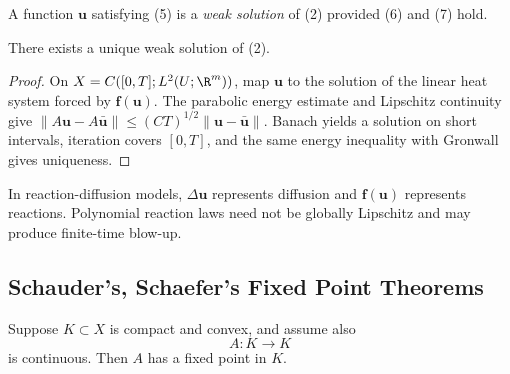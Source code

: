\begin{definition}
\label{def:weak-solution-reaction-diffusion-system}
A function $\mathbf{u}$ satisfying (5) is a \textit{weak solution} of (2) provided (6) and (7) hold.
\end{definition}

\begin{theorem}
\label{thm:reaction-diffusion-banach-existence}
There exists a unique weak solution of (2).
\end{theorem}

\begin{proof}
\sketch On $X=C([0,T];L^2(U;\R^m))$, map $\mathbf u$ to the solution of the linear heat system forced by $\mathbf f(\mathbf u)$. The parabolic energy estimate and Lipschitz continuity give $\|A\mathbf u-A\bar{\mathbf u}\|\leq(CT)^{1/2}\|\mathbf u-\bar{\mathbf u}\|$. Banach yields a solution on short intervals, iteration covers $[0,T]$, and the same energy inequality with Gronwall gives uniqueness.
\end{proof}

\begin{remark}
\label{rem:reaction-diffusion-chemical-interpretation}
In reaction-diffusion models, $\Delta\mathbf u$ represents diffusion and $\mathbf f(\mathbf u)$ represents reactions. Polynomial reaction laws need not be globally Lipschitz and may produce finite-time blow-up.
\end{remark}

\subsection{Schauder's, Schaefer's Fixed Point Theorems}
\label{sec:schauder-schaefer-fixed-point-theorems}

\begin{theorem}
\label{thm:schauders-fixed-point-theorem}
Suppose $K \subset X$ is compact and convex, and assume also
\[
A : K \to K
\]
is continuous. Then $A$ has a fixed point in $K$.
\end{theorem}

